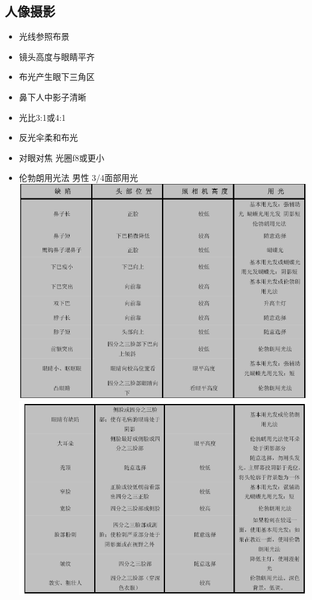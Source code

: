 \documentclass[
  letterpaper,
  DIV=11,
  numbers=noendperiod]{scrreprt}
\providecommand{\tightlist}{%
  \setlength{\itemsep}{0pt}\setlength{\parskip}{0pt}}\usepackage{longtable,booktabs,array}
\begin{document}
\subsection{人像摄影}\label{ux4ebaux50cfux6444ux5f71}

\begin{itemize}
\tightlist
\item
  光线参照布景
\item
  镜头高度与眼睛平齐
\item
  布光产生眼下三角区
\item
  鼻下人中影子清晰
\item
  光比3:1或4:1
\item
  反光伞柔和布光
\item
  对眼对焦 光圈f8或更小
\item
  伦勃朗用光法 男性 3/4面部用光 \includegraphics{images/renxiang1.png}
  \includegraphics{images/renxiang2.png}
\end{itemize}
\end{document}
